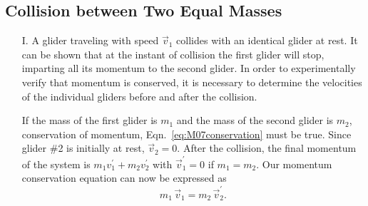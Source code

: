 \subsection{Collision between Two Equal Masses}

\begin{itemize}
\item[I.] A glider traveling with speed $\vec{v}_1$ collides with an identical glider at rest. It can be shown that at the instant of collision the first glider will stop, imparting all its momentum to the second glider.  In order to experimentally verify that momentum is conserved, it is necessary to determine the velocities of the individual gliders before and after the collision.
  
  If the mass of the first glider is $m_1$ and the mass of the second glider is $m_2$, conservation of momentum, Eqn.~\ref{eq:M07conservation} must be true.  Since glider \#2 is initially at rest, $\vec{v}_2 = 0$.  After the collision, the final momentum of the system is $m_1 v_1^\prime + m_2 v_2^\prime$ with $\vec{v}_1^\prime = 0$ if $m_1 = m_2$.  Our momentum conservation equation can now be expressed as
  \[ 
  m_1\, \vec{v}_1 = m_2\, \vec{v}_2^\prime.
  \]


\end{itemize}
